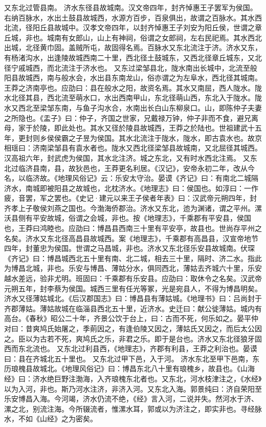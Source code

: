 \documentclass[12pt,UTF8]{ctexbook}
\begin{document}
又东北过管县南。
济水东径县故城南。汉文帝四年，封齐悼惠王子罢军为侯国。右纳百脉水，水出土鼓县故城西，水源方百步，百泉俱出，故谓之百脉水。其水西北流，径阳丘县故城中。汉孝文帝四年，以封齐悼惠王子刘安为阳丘侯，世谓之章丘城，非也。城南有女郎山，山上有神祠，俗谓之女郎祠，左右民祀焉。其水西北出城，北径黄巾固。盖贼所屯，故固得名焉。百脉水又东北流注于济。济水又东，有杨渚沟水，出逢陵故城西南二十里，西北径土鼓城东，又西北径章丘城东，又北径宁戚城西，而北流注于济水也。
又东过梁邹县北，陇水南出长城中，北流至般阳县故城西，南与般水会，水出县东南龙山，俗亦谓之为左阜水，西北径其城南。王莽之济南亭也。应劭曰：县在般水之阳，故资名焉。其水又南屈，西人陇水。陇水北径其县，西北流至萌水口，水出西南甲山，东北径萌山西，东北入于陇水。陇水又西北至梁邹东南，与鱼子沟水合，水南出长白山东柳泉口。山，即陈仲子夫妻之所隐也。《盂子》曰：仲子，齐国之世家，兄戴禄万钟，仲子非而不食，避兄离母，家于於陵，即此处也。其水又径於陵县故城西，王莽之於陆也。世祖建武十五年，更封则乡侯侯霸之子昱为侯国。其水北流注于陇水，陇水，即古袁水也。故京相瑶曰：济南梁邹县有袁水者也。陇水又西北径梁邹县故城南，又北屈径其城西。汉高祖六年，封武虎为侯国，其水北注济。城之东北，又有时水西北注焉。
又东北过临济县南，县，故狄邑也，王莽更名利居。《汉记》，安帝永初二年，改从今名，以临济故。《地理风俗记》云：乐安太守治。晏谟《齐记》曰：有南北二城隔济水，南城即被阳县之故城也，北枕济水。《地理志》曰：侯国也。如淳曰：一作疲，音罢，军之罢也。《史记·建元以来王子侯者年表》曰：汉武帝元朔四年，封齐孝上子敬侯刘燕之国也。今渤海侨郡治。济水又东北，迆为渊诸，谓之平州。漯沃县侧有平安故城，俗谓之会城，非也。按《地理志》，千乘郡有平安县，侯国也，王莽曰鸿睦也。应劭曰：博昌县西南三十里有平安亭，故县也。世尚存平州之名矣。济水又东北径高昌县故城西。案《地理志》，千乘郡有高昌县，汉宣帝地节四年，封董忠为侯国。世谓之马昌城，非也。济水又东北径乐安县故城南。伏琛《齐记》曰：博昌城西北五十里有南、北二城，相去三十里，隔时、济二水。指此为博昌北城，非也。乐安与博昌、薄姑分水，俱同西北，薄姑去齐城六十里，乐安越水差远，验非尤明。班固曰：千乘郡有乐安县。应劭曰：取休令之名矣。汉武帝元朔五年，封李蔡为侯国。城西三里有任光等冢，光是宛县人，不得为博昌明矣。济水又径薄姑城北。《后汉郡国志》曰：博昌县有薄姑城。《地理书》曰：吕尚封于齐郡薄姑。薄姑故城在临淄县西北五十里，近济水。史迁曰：献公徙薄姑。城内有高台。《春秋》昭公二十年，齐景公饮于台上，曰：古而不死，何乐如之。晏平仲对曰：昔爽鸠氏始屠之，季萴因之，有逢伯陵又因之，薄姑氏又因之，而后太公因之。臣以为古若不死，爽鸠氏之乐，非君之乐。即于是台也。济水又东北径狼牙固西而东北流也。
又东北过利县西，《地理志》，齐郡有利县，王莽之利治也。晏谟曰：县在齐城北五十里也。
又东北过甲下邑，入于河。
济水东北至甲下邑南，东历琅槐县故城北。《地理风俗记》曰：博昌东北八十里有琅槐乡，故县也。《山海经》曰：济水绝巨野注渤海，入齐琅槐东北者也。又东北，河水枝津注之，《水经》以为入河，非也。斯乃河水注济，非济入河。又东北入海。郭景纯曰：济自荣阳至乐安博昌入海。今河竭，济水仍流不绝，《经》言入河，二说并失。然河水于济、漯之北，别流注海。今所辍流者，惟漯水耳，郭或以为济注之，即实非也。寻经脉水，不如《山经》之为密矣。
\end{document}
